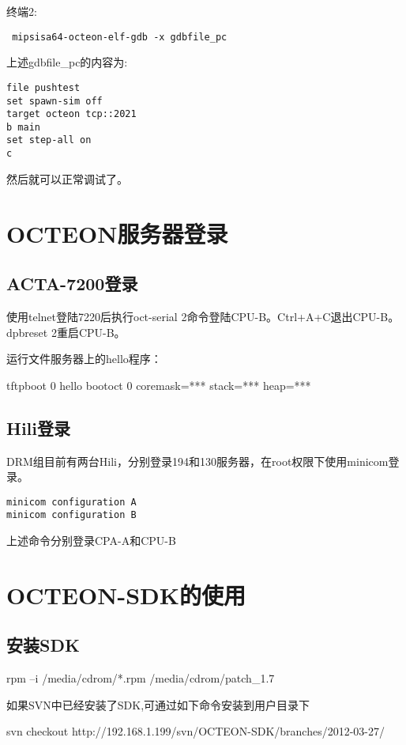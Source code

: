 终端2:
\begin{verbatim}
 mipsisa64-octeon-elf-gdb -x gdbfile_pc 
\end{verbatim}
上述gdbfile\_pc的内容为:

\begin{verbatim}
file pushtest
set spawn-sim off
target octeon tcp::2021
b main
set step-all on
c
\end{verbatim}

然后就可以正常调试了。

\section{OCTEON服务器登录}

\subsection{ACTA-7200登录}
使用telnet登陆7220后执行oct-serial 2命令登陆CPU-B。Ctrl+A+C退出CPU-B。dpbreset 2重启CPU-B。

运行文件服务器上的hello程序：
\begin{shellcmd}
tftpboot 0 hello
bootoct 0 coremask=*** stack=*** heap=***
\end{shellcmd}

\subsection{Hili登录}
DRM组目前有两台Hili，分别登录194和130服务器，在root权限下使用minicom登录。

\begin{verbatim}
minicom configuration A
minicom configuration B
\end{verbatim}

上述命令分别登录CPA-A和CPU-B
\section{OCTEON-SDK的使用}

\subsection{安装SDK}
\begin{shellcmd}
rpm –i /media/cdrom/*.rpm
/media/cdrom/patch_1.7
\end{shellcmd}
如果SVN中已经安装了SDK,可通过如下命令安装到用户目录下
\begin{shellcmd}
svn checkout http://192.168.1.199/svn/OCTEON-SDK/branches/2012-03-27/
\end{shellcmd}

